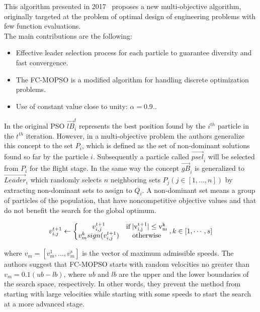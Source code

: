 This algorithm presented in 2017~\cite{mokarram2018new} proposes a new multi-objective algorithm, originally targeted at the problem of optimal design of engineering problems with few function evaluations.\\
The main contributions are the following:
\begin{itemize}
    \item Effective leader selection process for each particle to guarantee diversity and fast convergence.
    \item The FC-MOPSO is a modified algorithm for handling discrete optimization problems.
    \item Use of constant value close to unity: $\alpha = 0.9.$.
\end{itemize}
In the original PSO $\vec{lB}_i^t$ represents the best position found by the $i^{th}$ particle in the $t^{th}$ iteration. However, in a multi-objective problem the authors generalize this concept to the set $P_i$, which is defined as the set of non-dominant solutions found so far by the particle $i$. Subsequently a particle called $\vec{psel}_i$ will be selected from $P_i$ for the flight stage. In the same way the concept $\vec{gB}_i$ is generalized to $\vec{Leader}_i$ which randomly selects $n$ neighboring sets $P_j (j\in[1,...,n])$ by extracting non-dominant sets to assign to $Q_i$. A non-dominant set means a group of particles of the population, that have noncompetitive objective values and that do not benefit the search for the global optimum.

\begin{equation}
    v_{i,j}^{t+1} \leftarrow \left\{  \begin{matrix} v_{i,j}^{t+1} & \rm{ if} \, |v_{i,j}^{t+1}| \leq v_m^k \\ v_m^k sign ( v_{i,j}^{t+1} ) & \rm{otherwise} \end{matrix} \right. , k \in [1, \cdots,s]
\end{equation}

\noindent where $v_m = [v_m^1, \dots, v_m^s]$ is the vector of maximum admissible speeds. The authors suggest that FC-MOPSO starts with random velocities no greater than $v_{m} = 0.1(ub - lb)$, where $ub$ and $lb$ are the upper and the lower boundaries of the search space, respectively. In other words, they prevent the method from starting with large velocities while starting with some speeds to start the search at a more advanced stage. 



